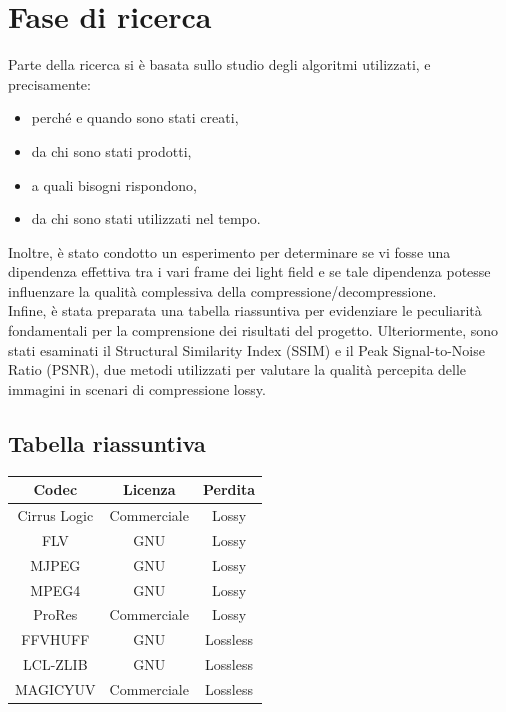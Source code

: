 \chapter{Fase di ricerca}

Parte della ricerca si è basata sullo studio degli algoritmi utilizzati, e precisamente:
\begin{itemize}
    \item perché e quando sono stati creati,
    \item da chi sono stati prodotti,
    \item a quali bisogni rispondono,
    \item da chi sono stati utilizzati nel tempo.
\end{itemize}
Inoltre, è stato condotto un esperimento per determinare se vi fosse una dipendenza effettiva tra i vari frame dei light field e se tale dipendenza potesse influenzare la qualità complessiva della compressione/decompressione.
\\
Infine, è stata preparata una tabella riassuntiva per evidenziare le peculiarità fondamentali per la comprensione dei risultati del progetto. Ulteriormente, sono stati esaminati il Structural Similarity Index (SSIM) e il Peak Signal-to-Noise Ratio (PSNR), due metodi utilizzati per valutare la qualità percepita delle immagini in scenari di compressione lossy.

\clearpage
\section{Tabella riassuntiva}
\begin{table}[ht]
    \centering
     \begin{tabular}{|c|c|c|}
        \hline
        Codec & Licenza & Perdita \\
        \hline
        Cirrus Logic & Commerciale & Lossy \\
        FLV & GNU & Lossy \\
        MJPEG & GNU & Lossy \\
        MPEG4 & GNU & Lossy \\
        ProRes & Commerciale & Lossy \\
        \hline
        FFVHUFF & GNU & Lossless \\
        LCL-ZLIB & GNU & Lossless \\
        MAGICYUV & Commerciale & Lossless \\
        \hline
    \end{tabular}
    \label{tab:RecapTable}
\end{table}

